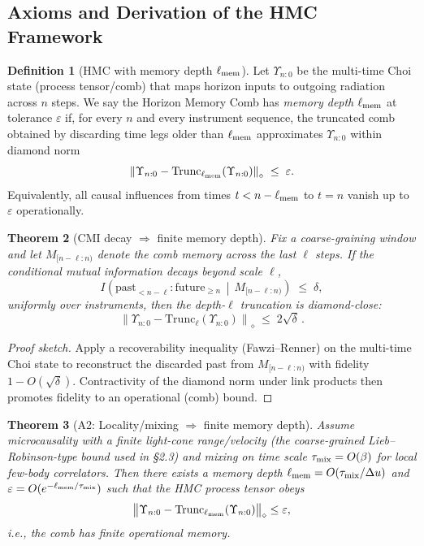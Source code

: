 \documentclass[aps,prd,preprint,onecolumn,superscriptaddress,nofootinbib,longbibliography,floatfix,11pt,showpacs,showkeys]{revtex4-2}
\newcommand{\normD}[1]{\left\lVert #1 \right\rVert_{\diamond}}
\newcommand{\Ddiamond}[1]{\normD{#1}}
\newcommand{\HMC}{\textsc{HMC}\xspace}
\theoremstyle{plain}
\newtheorem{theorem}{Theorem}
\theoremstyle{definition}
\newtheorem{definition}[theorem]{Definition}
\theoremstyle{remark}
\begin{document}
\subsection{Axioms and Derivation of the \HMC{} Framework}
\label{sec:assumptions}

\begin{definition}[\HMC{} with memory depth $\ell_{\rm mem}$]\label{def:hmc-memory-depth}
Let $\Upsilon_{n{:}0}$ be the multi-time Choi state (process tensor/comb) that maps horizon inputs to outgoing radiation across $n$ steps.
We say the Horizon Memory Comb has \emph{memory depth} $\ell_{\rm mem}$ at tolerance $\varepsilon$ if, for every $n$ and every instrument sequence, the truncated comb
obtained by discarding time legs older than $\ell_{\rm mem}$ approximates $\Upsilon_{n{:}0}$ within diamond norm
\[
  \Ddiamond{\Upsilon_{n{:}0}-\mathrm{Trunc}_{\ell_{\rm mem}}(\Upsilon_{n{:}0})}\;\le\;\varepsilon.
\]
Equivalently, all causal influences from times $t<n-\ell_{\rm mem}$ to $t=n$ vanish up to $\varepsilon$ operationally.
\end{definition}

\begin{theorem}[CMI decay $\Rightarrow$ finite memory depth]\label{thm:cmi-to-depth}
Fix a coarse-graining window and let $M_{[n-\ell{:}n)}$ denote the comb memory across the last $\ell$ steps.
If the conditional mutual information decays beyond scale $\ell$,
\[
I\!\left( \text{past}_{<n-\ell} : \text{future}_{\ge n} \,\middle|\, M_{[n-\ell{:}n)} \right)\;\le\;\delta,
\]
uniformly over instruments, then the depth-$\ell$ truncation is diamond-close:
\[
\Ddiamond{\Upsilon_{n{:}0}-\mathrm{Trunc}_{\ell}(\Upsilon_{n{:}0})}\;\le\;2\sqrt{\delta}\,.
\]
\end{theorem}
\begin{proof}[Proof sketch]
Apply a recoverability inequality (Fawzi--Renner) on the multi-time Choi state to reconstruct the discarded past from $M_{[n-\ell{:}n)}$ with fidelity $1-O(\sqrt{\delta})$.
Contractivity of the diamond norm under link products then promotes fidelity to an operational (comb) bound.
\end{proof}

\begin{theorem}[A2: Locality/mixing $\Rightarrow$ finite memory depth]\label{thm:A2}
Assume microcausality with a finite light-cone range/velocity (the coarse-grained Lieb--Robinson-type bound used in §2.3) and mixing on time scale $\tau_{\rm mix}=O(\beta)$ for local few-body correlators. Then there exists a memory depth $\ell_{\rm mem}=O(\tau_{\rm mix}/\Delta u)$ and $\varepsilon=O(e^{-\ell_{\rm mem}/\tau_{\rm mix}})$ such that the HMC process tensor obeys
\[
\bigl\|\Upsilon_{n:0}-\mathrm{Trunc}_{\ell_{\rm mem}}(\Upsilon_{n:0})\bigr\|_{\diamond}\le \varepsilon,
\]
i.e., the comb has finite operational memory.
\end{theorem}
\end{document}
